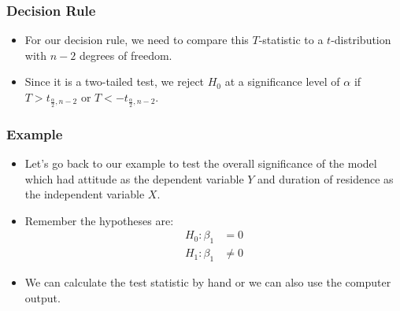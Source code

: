 \documentclass[12pt]{beamer}
\begin{document}
	\begin{frame}
		\frametitle{Decision Rule}
		
		\begin{itemize}[label={\color{blue}$\blacktriangleright$}]
			\item For our decision rule, we need to compare this $T$-statistic to a $t$-distribution with $n-2$ degrees of freedom.
			
			\item Since it is a two-tailed test, we reject $H_0$ at a significance level of $\alpha$ if $T > t_{\frac{\alpha}{2},n-2}$ or $T < -t_{\frac{\alpha}{2},n-2}$.
			
		\end{itemize}
		
	\end{frame}
	\begin{frame}
		\frametitle{Example}
		
		\begin{itemize}[label={\color{blue}$\blacktriangleright$}]
			\item Let's go back to our example to test the overall significance of the model which had attitude as the dependent variable $Y$ and duration of residence as the independent variable $X$.
			
			\item Remember the hypotheses are:
			\[
			\begin{aligned}
				H_0 : \beta_1 &= 0 \\
				H_1 : \beta_1 &\neq 0
			\end{aligned}
			\]
			
			\item We can calculate the test statistic by hand or we can also use the computer output.
			
		\end{itemize}
		
	\end{frame}
\end{document}
